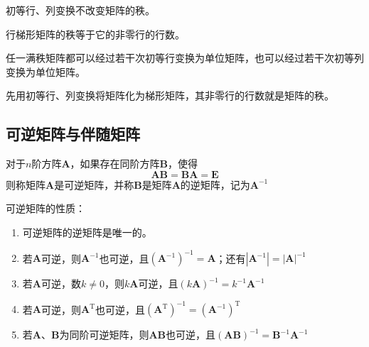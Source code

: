 \begin{theorem}
    初等行、列变换不改变矩阵的秩。
\end{theorem}

\begin{theorem}
    行梯形矩阵的秩等于它的非零行的行数。
\end{theorem}

\begin{theorem}
    任一满秩矩阵都可以经过若干次初等行变换为单位矩阵，也可以经过若干次初等列变换为单位矩阵。
\end{theorem}

\begin{theorem}[求矩阵的秩的方法]
    先用初等行、列变换将矩阵化为梯形矩阵，其非零行的行数就是矩阵的秩。
\end{theorem}

\subsection{可逆矩阵与伴随矩阵}
\begin{definition}[逆矩阵]
    对于$n$阶方阵$\boldsymbol{A}$，如果存在同阶方阵$\boldsymbol{B}$，使得
    $$\boldsymbol{A}\boldsymbol{B}=\boldsymbol{B}\boldsymbol{A}=\boldsymbol{E}$$
    则称矩阵$\boldsymbol{A}$是{\heiti 可逆矩阵}，并称$\boldsymbol{B}$是矩阵$\boldsymbol{A}$的{\heiti 逆矩阵}，记为$\boldsymbol{A}^{-1}$
\end{definition}


\begin{theorem}
    可逆矩阵的性质：
    \begin{enumerate}[(1)]
        \item 可逆矩阵的逆矩阵是唯一的。
        \item 若$\boldsymbol{A}$可逆，则$\boldsymbol{A}^{-1}$也可逆，且${(\boldsymbol{A}^{-1})}^{-1}=\boldsymbol{A}$；还有$|\boldsymbol{A}^{-1}|=|\boldsymbol{A}|^{-1}$
        \item 若$\boldsymbol{A}$可逆，数$k\neq 0$，则$k\boldsymbol{A}$可逆，且${(k\boldsymbol{A})}^{-1}=k^{-1}\boldsymbol{A}^{-1}$
        \item 若$\boldsymbol{A}$可逆，则$\boldsymbol{A}^\mathrm{T}$也可逆，且${(\boldsymbol{A}^\mathrm{T})}^{-1}={(\boldsymbol{A}^{-1})}^{\mathrm{T}}$
        \item 若$\boldsymbol{A}$、$\boldsymbol{B}$为同阶可逆矩阵，则$\boldsymbol{A}\boldsymbol{B}$也可逆，且${(\boldsymbol{A}\boldsymbol{B})}^{-1}=\boldsymbol{B}^{-1}\boldsymbol{A}^{-1}$
    \end{enumerate}
\end{theorem}

